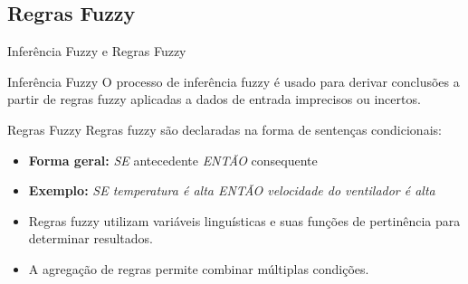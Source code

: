 \documentclass[aspectratio=169]{beamer}
\begin{document}
\subsection{Regras Fuzzy}
\footnotesize
\begin{frame}{Inferência Fuzzy e Regras Fuzzy}
    \begin{block}{Inferência Fuzzy}
        O processo de inferência fuzzy é usado para derivar conclusões a partir de regras fuzzy aplicadas a dados de entrada imprecisos ou incertos.
    \end{block}
    \pause
    \begin{block}{Regras Fuzzy}
        Regras fuzzy são declaradas na forma de sentenças condicionais:
        \begin{itemize}
            \item \textbf{Forma geral:} \textit{SE} antecedente \textit{ENTÃO} consequente
            \item \textbf{Exemplo:} \textit{SE temperatura é alta ENTÃO velocidade do ventilador é alta}
        \end{itemize}
    \end{block}
    \pause
    \begin{itemize}
        \item Regras fuzzy utilizam variáveis linguísticas e suas funções de pertinência para determinar resultados.
        \item A agregação de regras permite combinar múltiplas condições.
    \end{itemize}
    \pause
    \centering
\end{frame}
\end{document}
